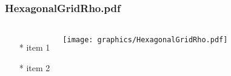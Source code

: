 \begin{frame} \frametitle{HexagonalGridRho.pdf}
    \begin{columns}[c]
        \begin{itemize}
            \item[*] item 1
            \item[*] item 2
        \end{itemize}
        \begin{minipage}{\linewidth}
            \begin{center}
            \texttt{[image: graphics/HexagonalGridRho.pdf]}
            \label{gfx:HexagonalGridRho.pdf}
            \end{center}
        \end{minipage}
    \end{columns}
\end{frame}

